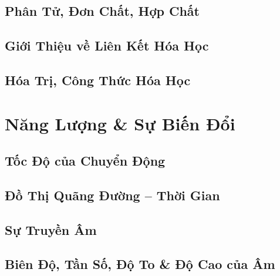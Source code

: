 \documentclass{article}
\numberwithin{equation}{section}
\begin{document}

\subsection{Phân Tử, Đơn Chất, Hợp Chất}


\subsection{Giới Thiệu về Liên Kết Hóa Học}


\subsection{Hóa Trị, Công Thức Hóa Học}


\section{Năng Lượng \& Sự Biến Đổi}

\subsection{Tốc Độ của Chuyển Động}


\subsection{Đồ Thị Quãng Đường -- Thời Gian}


\subsection{Sự Truyền Âm}


\subsection{Biên Độ, Tần Số, Độ To \& Độ Cao của Âm}
\end{document}
